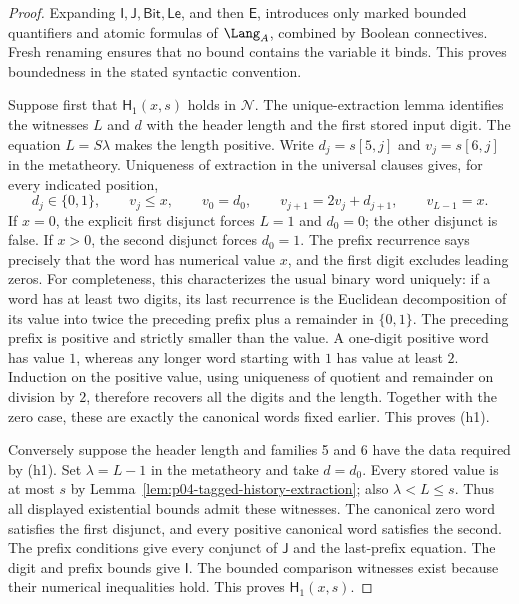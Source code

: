 \begin{proof}
Expanding \(\mathsf I,\mathsf J,\mathsf{Bit},\mathsf{Le}\), and
then \(\mathsf E\), introduces only marked bounded quantifiers and
atomic formulas of \(\Lang_A\), combined by Boolean connectives.
Fresh renaming ensures that no bound contains the variable it binds.
This proves boundedness in the stated syntactic convention.

Suppose first that \(\mathsf H_1(x,s)\) holds in \(\mathcal N\).
The unique-extraction lemma identifies the witnesses \(L\) and \(d\)
with the header length and the first stored input digit.  The equation
\(L=S\lambda\) makes the length positive.  Write \(d_j=s[5,j]\)
and \(v_j=s[6,j]\) in the metatheory.  Uniqueness of extraction in
the universal clauses gives, for every indicated position,
\[
 d_j\in\{0,1\},\qquad v_j\leq x,\qquad
 v_0=d_0,\qquad v_{j+1}=2v_j+d_{j+1},\qquad v_{L-1}=x.
\]
If \(x=0\), the explicit first disjunct forces \(L=1\) and
\(d_0=0\); the other disjunct is false.  If \(x>0\), the second
disjunct forces \(d_0=1\).  The prefix recurrence says precisely
that the word has numerical value \(x\), and the first digit excludes
leading zeros.  For completeness, this characterizes the usual binary
word uniquely: if a word has at least two digits, its last recurrence
is the Euclidean decomposition of its value into twice the preceding
prefix plus a remainder in \(\{0,1\}\).  The preceding prefix is
positive and strictly smaller than the value.  A one-digit positive
word has value \(1\), whereas any longer word starting with \(1\)
has value at least \(2\).  Induction on the positive value, using
uniqueness of quotient and remainder on division by \(2\), therefore
recovers all the digits and the length.  Together with the zero case,
these are exactly the canonical words fixed earlier.  This proves (h1).

Conversely suppose the header length and families 5 and 6 have the
data required by (h1).  Set \(\lambda=L-1\) in the metatheory and
take \(d=d_0\).  Every stored value is at most \(s\) by
Lemma~\ref{lem:p04-tagged-history-extraction}; also
\(\lambda<L\leq s\).  Thus all displayed existential bounds
admit these witnesses.  The canonical zero word satisfies the first
disjunct, and every positive canonical word satisfies the second.
The prefix conditions give every conjunct of \(\mathsf J\) and the
last-prefix equation.  The digit and prefix bounds give \(\mathsf I\).
The bounded comparison witnesses exist because their numerical
inequalities hold.  This proves \(\mathsf H_1(x,s)\).
\end{proof}

